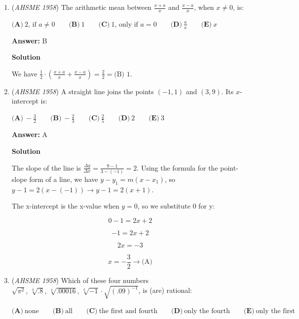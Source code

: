\begin{enumerate}
 $\frac{4 + 2\sqrt2 + 2 - \sqrt2 - \sqrt2 - 2}{2} \Rightarrow \frac{4}{2} \Rightarrow 2 \Rightarrow \boxed{A}$



	\item (\textit{AHSME 1958}) The arithmetic mean between $\frac {x + a}{x}$ and $\frac {x - a}{x}$, when $x \neq 0$, is:


 $\textbf{(A)}\ {2}\text{, if }{a \neq 0}\qquad \textbf{(B)}\ 1\qquad \textbf{(C)}\ {1}\text{, only if }{a = 0}\qquad \textbf{(D)}\ \frac {a}{x}\qquad \textbf{(E)}\ x$

 \textbf{Answer: }B



\textbf{Solution}

We have $\frac{1}{2}\cdot \left(\frac{x + a}{x} + \frac{x - a}{x}\right) = \frac{2}{2} = \boxed{\text{(B) }{1}}$.

 


	\item (\textit{AHSME 1958}) A straight line joins the points $(-1,1)$ and $(3,9)$. Its $x$-intercept is:


 $\textbf{(A)}\ -\frac{3}{2}\qquad  \textbf{(B)}\ -\frac{2}{3}\qquad  \textbf{(C)}\ \frac{2}{5}\qquad  \textbf{(D)}\ 2\qquad  \textbf{(E)}\ 3$

 \textbf{Answer: }A



\textbf{Solution}

The slope of the line is $\frac{ \Delta y }{ \Delta x} = \frac{9-1}{3-(-1)} = 2$. Using the formula for the point-slope form of a line, we have $y-y_1 = m(x-x_1)$, so $y-1=2(x-(-1)) \to y-1=2(x+1)$.

 The x-intercept is the x-value when $y=0$, so we substitute 0 for y:

 
 \[0-1=2x+2\]

 \[-1=2x+2\]

 \[2x = -3\]

 \[x = -\frac{3}{2} \to \boxed{\text{(A)}}\]



	\item (\textit{AHSME 1958}) Which of these four numbers $\sqrt{\pi^2},\,\sqrt[3]{.8},\,\sqrt[4]{.00016},\,\sqrt[3]{-1}\cdot \sqrt{(.09)^{-1}}$, is (are) rational:


 $\textbf{(A)}\ \text{none}\qquad  \textbf{(B)}\ \text{all}\qquad  \textbf{(C)}\ \text{the first and fourth}\qquad  \textbf{(D)}\ \text{only the fourth}\qquad  \textbf{(E)}\ \text{only the first}$


\end{enumerate}
